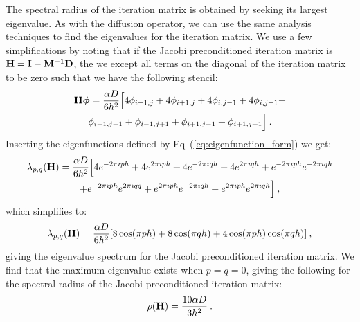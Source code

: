 The spectral radius of the iteration matrix is obtained by seeking its
largest eigenvalue. As with the diffusion operator, we can use the
same analysis techniques to find the eigenvalues for the iteration
matrix. We use a few simplifications by noting that if the Jacobi
preconditioned iteration matrix is $\mathbf{H} = \mathbf{I} -
\mathbf{M}^{-1}\mathbf{D}$, the we except all terms on the diagonal of the
iteration matrix to be zero such that we have the following stencil:
\begin{multline}
  \mathbf{H}\boldsymbol{\phi} = \frac{\alpha D}{6h^2}\Big[4 \phi_{i-1,j} +
    4 \phi_{i+1,j} + 4 \phi_{i,j-1} + 4 \phi_{i,j+1}
    +\\ \phi_{i-1,j-1} + \phi_{i-1,j+1} + \phi_{i+1,j-1} +
    \phi_{i+1,j+1}\Big]\:.
  \label{eq:iteration_stencil}
\end{multline}
Inserting the eigenfunctions defined by
Eq~(\ref{eq:eigenfunction_form}) we get:
\begin{multline}
  \lambda_{p,q}(\mathbf{H}) = \frac{\alpha D}{6h^2}\Big[4 e^{-2 \pi \imath p
      h} + 4 e^{2 \pi \imath p h} + 4 e^{-2 \pi \imath q h} + 4 e^{2
      \pi \imath q h} + e^{-2 \pi \imath p h} e^{-2 \pi \imath q h}
    \\ + e^{-2 \pi \imath p h} e^{2 \pi \imath q q} + e^{2 \pi \imath
      p h} e^{-2 \pi \imath q h} + e^{2 \pi \imath p h} e^{2 \pi
      \imath q h}\Big]\:,
  \label{eq:iteration_deriv}
\end{multline}
which simplifies to:
\begin{equation}
  \lambda_{p,q}(\mathbf{H}) = \frac{\alpha D}{6h^2}[ 8 \cos(\pi p h) + 8
    \cos(\pi q h) + 4 \cos(\pi p h) \cos(\pi q h)]\:,
  \label{eq:iteration_spectrum}
\end{equation}
giving the eigenvalue spectrum for the Jacobi preconditioned iteration
matrix. We find that the maximum eigenvalue exists when $p=q=0$,
giving the following for the spectral radius of the Jacobi
preconditioned iteration matrix:
\begin{equation}
  \rho(\mathbf{H}) = \frac{10 \alpha D}{3 h^2}\:.
  \label{eq:iteration_radius}
\end{equation}

\clearpage 

